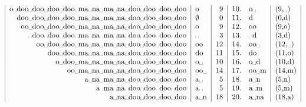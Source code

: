 \documentclass[11pt]{article}
\newcommand{\tvs}{\textvisiblespace}
\begin{document}
\begin{itemize}
\[\begin{tabular}{|r|l|r|l|l|}
                                     o\tvs doo\tvs doo\tvs doo\tvs doo\tvs ma\tvs na\tvs ma\tvs na\tvs doo\tvs doo\tvs doo\tvs doo &     o     &   9       & 10.\quad o\tvs               & (9,\tvs)\\
                                           doo\tvs doo\tvs doo\tvs doo\tvs ma\tvs na\tvs ma\tvs na\tvs doo\tvs doo\tvs doo\tvs doo &$\emptyset$&   0       & 11.\quad d                   & (0,d)\\
                                            oo\tvs doo\tvs doo\tvs doo\tvs ma\tvs na\tvs ma\tvs na\tvs doo\tvs doo\tvs doo\tvs doo &     o     &   9       & 12.\quad oo                  & (9,o)\\
                                              \tvs doo\tvs doo\tvs doo\tvs ma\tvs na\tvs ma\tvs na\tvs doo\tvs doo\tvs doo\tvs doo &   \tvs    &   3       & 13.\quad \tvs d              & (3,d)\\
                                                    oo\tvs doo\tvs doo\tvs ma\tvs na\tvs ma\tvs na\tvs doo\tvs doo\tvs doo\tvs doo &    oo     &  12       & 14.\quad oo\tvs              & (12,\tvs)\\
                                                           doo\tvs doo\tvs ma\tvs na\tvs ma\tvs na\tvs doo\tvs doo\tvs doo\tvs doo &    do     &  11       & 15.\quad do                  & (11,o)\\
                                                             o\tvs doo\tvs ma\tvs na\tvs ma\tvs na\tvs doo\tvs doo\tvs doo\tvs doo &  o\tvs    &  10       & 16.\quad o\tvs d             & (10,d)\\
                                                                    oo\tvs ma\tvs na\tvs ma\tvs na\tvs doo\tvs doo\tvs doo\tvs doo & oo\tvs    &  14       & 17.\quad oo\tvs m            & (14,m)\\
                                                                            a\tvs na\tvs ma\tvs na\tvs doo\tvs doo\tvs doo\tvs doo &  a\tvs    &   5       & 18.\quad a\tvs n             & (5,n)\\
                                                                                   a\tvs ma\tvs na\tvs doo\tvs doo\tvs doo\tvs doo &  a\tvs    &   5       & 19.\quad a\tvs m             & (5,m)\\
                                                                                          a\tvs na\tvs doo\tvs doo\tvs doo\tvs doo &  a\tvs n  &  18       & 20.\quad a\tvs na            & (18,a)\\

\end{tabular}\]
\end{itemize}
\end{document}
